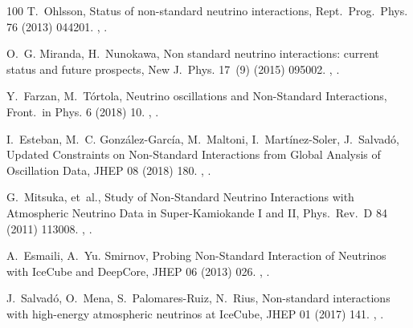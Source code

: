 \documentclass[final,5p,times,twocolumn]{elsarticle}
\begin{document}
\begin{thebibliography}{100}
T.~Ohlsson, {Status of non-standard neutrino interactions}, Rept.\ Prog.\ Phys.
  76 (2013) 044201.
\newblock \href {http://arxiv.org/abs/1209.2710} {},
  \href {http://dx.doi.org/10.1088/0034-4885/76/4/044201}
  {}.

O.~G. Miranda, H.~Nunokawa, {Non standard neutrino interactions: current status
  and future prospects}, New J.\ Phys. 17~(9) (2015) 095002.
\newblock \href {http://arxiv.org/abs/1505.06254} {},
  \href {http://dx.doi.org/10.1088/1367-2630/17/9/095002}
  {}.

Y.~Farzan, M.~T{\'o}rtola, {Neutrino oscillations and Non-Standard
  Interactions}, Front.\ in Phys. 6 (2018) 10.
\newblock \href {http://arxiv.org/abs/1710.09360} {},
  \href {http://dx.doi.org/10.3389/fphy.2018.00010}
  {}.

I.~Esteban, M.~C. Gonz{\'a}lez-Garc{\'i}a, M.~Maltoni, I.~Mart{\'i}nez-Soler,
  J.~Salvad{\'o}, {Updated Constraints on Non-Standard Interactions from Global
  Analysis of Oscillation Data}, JHEP 08 (2018) 180.
\newblock \href {http://arxiv.org/abs/1805.04530} {},
  \href {http://dx.doi.org/10.1007/JHEP08(2018)180}
  {}.

G.~Mitsuka, et~al., {Study of Non-Standard Neutrino Interactions with
  Atmospheric Neutrino Data in Super-Kamiokande I and II}, Phys.\ Rev.\ D 84
  (2011) 113008.
\newblock \href {http://arxiv.org/abs/1109.1889} {},
  \href {http://dx.doi.org/10.1103/PhysRevD.84.113008}
  {}.

A.~Esmaili, A.~{\relax Yu}. Smirnov, {Probing Non-Standard Interaction of
  Neutrinos with IceCube and DeepCore}, JHEP 06 (2013) 026.
\newblock \href {http://arxiv.org/abs/1304.1042} {},
  \href {http://dx.doi.org/10.1007/JHEP06(2013)026}
  {}.

J.~Salvad{\'o}, O.~Mena, S.~Palomares-Ruiz, N.~Rius, {Non-standard interactions
  with high-energy atmospheric neutrinos at IceCube}, JHEP 01 (2017) 141.
\newblock \href {http://arxiv.org/abs/1609.03450} {},
  \href {http://dx.doi.org/10.1007/JHEP01(2017)141}
  {}.


\end{thebibliography}
\end{document}

